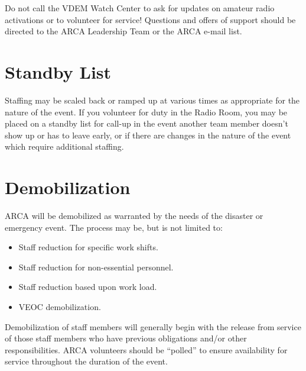 \documentclass[pdflatex,letterpaper,twoside,12pt]{book}
\begin{document}
Do not call the VDEM Watch Center to ask for updates on amateur radio activations or to volunteer for service!  Questions and offers of support should be directed to the ARCA Leadership Team or the ARCA e-mail list.


\section{Standby List}

Staffing may be scaled back or ramped up at various times as appropriate for the nature of the event.  If you volunteer for duty in the Radio Room, you may be placed on a standby list for call-up in the event another team member doesn't show up or has to leave early, or if there are changes in the nature of the event which require additional staffing.


\section{Demobilization}

ARCA will be demobilized as warranted by the needs of the disaster or emergency event.  The process may be, but is not limited to:

\begin{itemize}
	\item Staff reduction for specific work shifts.
	\item Staff reduction for non-essential personnel.
	\item Staff reduction based upon work load.
	\item VEOC demobilization.
\end{itemize}

Demobilization of staff members will generally begin with the release from service of those staff members who have previous obligations and/or other responsibilities.  ARCA volunteers should be “polled” to ensure availability for service throughout the duration of the event.

\end{document}
